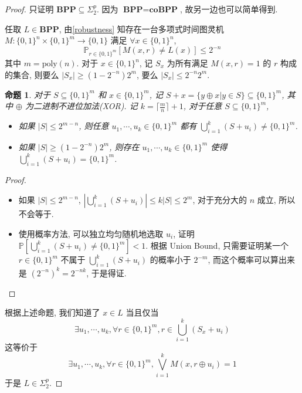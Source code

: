 \documentclass[8pt]{article}
\theoremstyle{compact}
\newtheorem{proposition}[theorem]{命题}
\def\le{\leqslant}
\def\ge{\geqslant}
\def\BPP{\textbf{BPP}}
\def\coBPP{\textbf{coBPP}}
\begin{document}
\begin{proof}
	只证明 $\BPP \subseteq \Sigma_2^p$. 因为 $\BPP = \coBPP$, 故另一边也可以简单得到.

	任取 $L \in \BPP$, 由\cref{robustness} 知存在一台多项式时间图灵机 $M: \{0, 1\}^n \times \{0, 1\}^{m} \to \{0, 1\}$ 满足 $\forall x \in \{0, 1\}^n$, $$\mathbb P_{r \in \{0, 1\}^{m}}[M(x, r) \neq L(x)] \le 2^{-n}$$ 其中 $m = \text{poly}(n)$. 对于 $x \in \{0, 1\}^n$, 记 $S_x$ 为所有满足 $M(x, r) = 1$ 的 $r$ 构成的集合, 则要么 $|S_x| \ge (1 - 2^{-n})2^m$, 要么 $|S_x| \le 2^{-n}2^m$.
	\begin{proposition}
		对于 $S \subseteq \{0, 1\}^m$ 和 $x \in \{0, 1\}^m$, 记 $S + x = \{y \oplus x | y \in S\} \subseteq \{0, 1\}^m$, 其中 $\oplus$ 为二进制不进位加法(XOR). 记 $k = \lceil \frac mn \rceil + 1$, 对于任意 $S \subseteq \{0, 1\}^m$, \begin{itemize}
			\item 如果 $|S| \le 2^{m-n}$, 则任意 $u_1, \cdots, u_k \in \{0, 1\}^m$ 都有 $\bigcup_{i=1}^k (S + u_i) \neq \{0, 1\}^m$.
		    \item 如果 $|S| \ge (1-2^{-n})2^m$, 则存在 $u_1, \cdots, u_k \in \{0, 1\}^m$ 使得 $\bigcup_{i=1}^k (S + u_i) = \{0, 1\}^m$.
		\end{itemize}
	\end{proposition}
	\begin{proof}
		\begin{itemize}
			\item 如果 $|S| \le 2^{m-n}$, $\left|\bigcup_{i=1}^k (S + u_i)\right| \le k|S| \le 2^m$, 对于充分大的 $n$ 成立, 所以不会等于.
		   \item 使用概率方法, 可以独立均匀随机地选取 $u_i$, 证明 $\mathbb P\left[\bigcup_{i=1}^k (S + u_i) \neq \{0, 1\}^m\right] < 1$. 根据 Union Bound, 只需要证明某一个 $r \in \{0, 1\}^m$ 不属于 $\bigcup_{i=1}^k (S + u_i)$ 的概率小于 $2^{-m}$, 而这个概率可以算出来是 $(2^{-n})^k = 2^{-nk}$, 于是得证.
		\end{itemize}
	\end{proof}

	根据上述命题, 我们知道了 $x \in L$ 当且仅当 $$\exists u_1, \cdots, u_k, \forall r \in \{0, 1\}^m, r \in \bigcup_{i=1}^k (S_x + u_i)$$ 这等价于 $$\exists u_1, \cdots, u_k, \forall r \in \{0, 1\}^m, \bigvee_{i=1}^k M(x, r \oplus u_i) = 1$$ 于是 $L \in \Sigma_2^p$.
\end{proof}
\end{document}
